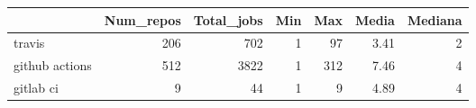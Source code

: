 \begin{tabular}{lrrrrrr}
\toprule
{} &  Num\_repos &  Total\_jobs &  Min &  Max &  Media &  Mediana \\
\midrule
travis         &        206 &         702 &    1 &   97 &   3.41 &        2 \\
github actions &        512 &        3822 &    1 &  312 &   7.46 &        4 \\
gitlab ci      &          9 &          44 &    1 &    9 &   4.89 &        4 \\
\bottomrule
\end{tabular}
